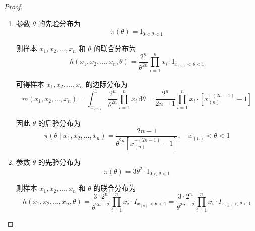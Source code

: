 \documentclass[normal,founder,mtpro2,cn]{elegantnote}
\begin{document}
\begin{enumerate}
\begin{proof}
            \begin{enumerate}
                \item
                      参数 $\theta$ 的先验分布为
                      \begin{equation*}
                          \pi(\theta)=\mathrm{I}_{0<\theta<1}
                      \end{equation*}

                      则样本 $x_{1},x_{2},\ldots,x_{n}$ 和 $\theta$ 的联合分布为
                      \begin{equation*}
                          h\left(x_{1},x_{2},\ldots,x_{n},\theta\right)=\frac{2^{n}}{\theta^{2n}}\prod_{i=1}^{n}x_{i}\cdot\mathrm{I}_{x_{(n)}<\theta<1}
                      \end{equation*}

                      可得样本 $x_{1},x_{2},\ldots,x_{n}$ 的边际分布为
                      \begin{equation*}
                          m\left(x_{1},x_{2},\ldots,x_{n}\right)=\int_{x_{(n)}}^{1}\frac{2^{n}}{\theta^{2n}}\prod_{i=1}^{n}x_{i}\,\mathrm{d}\theta=\frac{2^{n}}{2n-1}\prod_{i=1}^{n}x_{i}\cdot\left[x_{(n)}^{-(2n-1)}-1\right]
                      \end{equation*}

                      因此 $\theta$ 的后验分布为
                      \begin{equation*}
                          \pi\left(\theta\mid x_{1},x_{2},\ldots,x_{n}\right)=\frac{2n-1}{\theta^{2n}\left[x_{(n)}^{-(2n-1)}-1\right]},\quad x_{(n)}<\theta<1
                      \end{equation*}
                \item
                      参数 $\theta$ 的先验分布为
                      \begin{equation*}
                          \pi(\theta)=3\theta^{2}\cdot\mathrm{I}_{0<\theta<1}
                      \end{equation*}

                      则样本 $x_{1},x_{2},\ldots,x_{n}$ 和 $\theta$ 的联合分布为
                      \begin{equation*}
                          h\left(x_{1},x_{2},\ldots,x_{n},\theta\right)=\frac{3\cdot 2^{n}}{\theta^{2n-2}}\prod_{i=1}^{n}x_{i}\cdot I_{x_{(n)}<\theta<1}=\frac{3\cdot 2^{n}}{\theta^{2n-2}}\prod_{i=1}^{n}x_{i}\cdot I_{x_{(n)}<\theta<1}
                      \end{equation*}


\end{enumerate}
\end{proof}
\end{enumerate}
\end{document}
